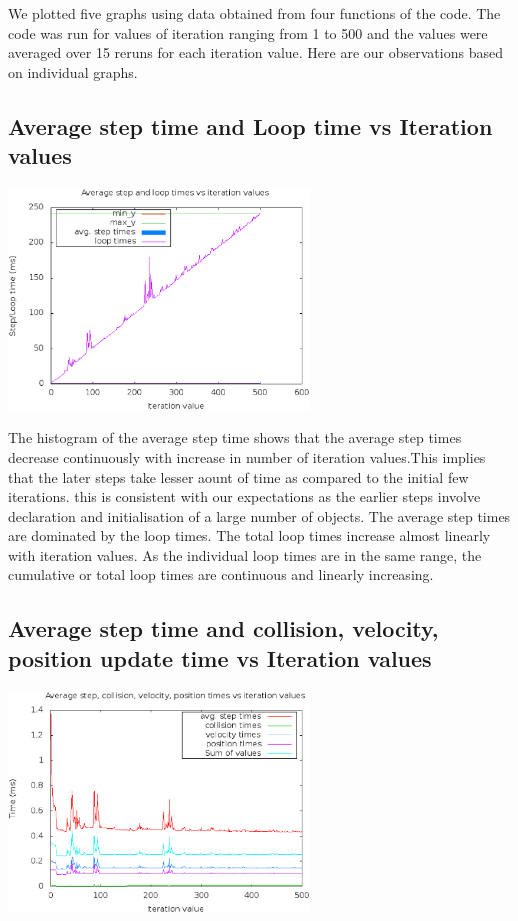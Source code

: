 \documentclass[a4paper,11pt]{article}
\begin{document}
We plotted five graphs using data obtained from four functions of the code. The code was run for values of iteration ranging from 1 to 500 and the values were averaged over 15 reruns for each iteration value. Here are our observations based on individual graphs. 

\subsection{Average step time and Loop time vs Iteration values}

\begin{center}
\includegraphics[width=0.6\textwidth]{plots/g05_plot01.eps} 
\end{center}

The histogram of the average step time shows that the average step times decrease continuously with increase in number of iteration values.This implies that the later steps take lesser aount of time as compared to the initial few iterations. this is consistent with our expectations as the earlier steps involve declaration and initialisation of a large number of objects.
The average step times are dominated by the loop times. The total loop times increase almost linearly with iteration values. As the individual loop times are in the same range, the cumulative or total loop times are continuous and linearly increasing.   

\subsection{Average step time and collision, velocity, position update time vs Iteration values}

\begin{center}
\includegraphics[width=0.6\textwidth]{plots/g05_plot02.eps} 
\end{center}
\end{document}
